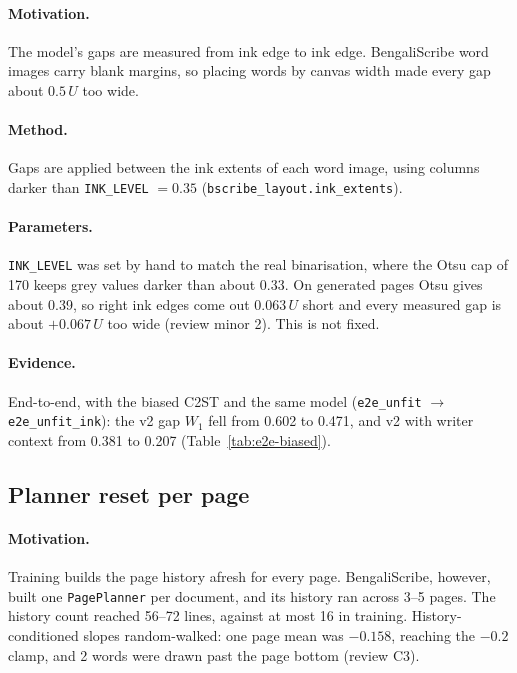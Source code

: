 \documentclass[11pt,a4paper]{article}
\newcommand{\U}{\ensuremath{U}}
\begin{document}
\paragraph{Motivation.} The model's gaps are measured from ink edge to ink edge.
BengaliScribe word images carry blank margins, so placing words by canvas width
made every gap about $0.5\,\U$ too wide.

\paragraph{Method.} Gaps are applied between the ink extents of each word image,
using columns darker than \texttt{INK\_LEVEL} $=0.35$
(\texttt{bscribe\_layout.ink\_extents}).

\paragraph{Parameters.} \texttt{INK\_LEVEL} was set by hand to match the real
binarisation, where the Otsu cap of 170 keeps grey values darker than about
0.33. On generated pages Otsu gives about 0.39, so right ink edges come out
$0.063\,\U$ short and every measured gap is about $+0.067\,\U$ too wide
(review minor 2). This is not fixed.

\paragraph{Evidence.} End-to-end, with the biased C2ST and the same model
(\texttt{e2e\_unfit} $\rightarrow$ \texttt{e2e\_unfit\_ink}): the v2 gap $W_1$
fell from 0.602 to 0.471, and v2 with writer context from 0.381 to 0.207
(Table~\ref{tab:e2e-biased}).

\subsection{Planner reset per page}
\label{sec:reset}
\paragraph{Motivation.} Training builds the page history afresh for every page.
BengaliScribe, however, built one \texttt{PagePlanner} per document, and its
history ran across 3--5 pages. The history count reached 56--72 lines, against
at most 16 in training. History-conditioned slopes random-walked: one page
mean was $-0.158$, reaching the $-0.2$ clamp, and 2 words were drawn past the
page bottom (review C3).
\end{document}
